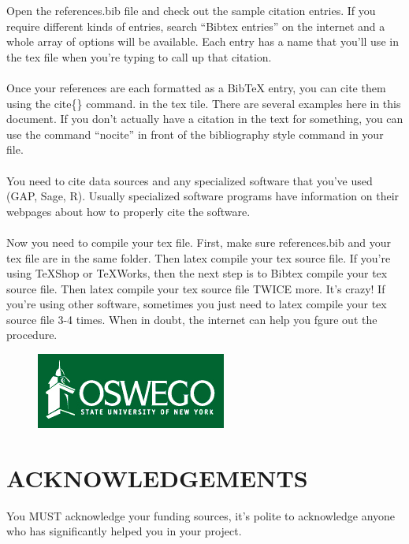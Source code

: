 \documentclass[landscape]{sciposter}
\begin{document}
\begin{multicols}{4}
Open the references.bib file and check out the sample citation entries.  If you require different kinds of entries, search ``Bibtex entries'' on the internet and a whole array of options will be available.  Each entry has a name that you'll use in the tex file when you're typing to call up that citation.
\\
\\
Once your references are each formatted as a BibTeX entry, you can cite them using the cite\{\} command.  in the tex tile.  There are several examples here in this document.  If you don't actually have a citation in the text for something, you can use the command ``nocite'' in front of the bibliography style command in your file.  
\\
\\
You need to cite data sources and any specialized software that you've used (GAP, Sage, R).  Usually specialized software programs have information on their webpages about how to properly cite the software.  
\\
\\
Now you need to compile your tex file.  First, make sure references.bib and your tex file are in the same folder.  Then latex compile your tex source file.  If you're using TeXShop or TeXWorks, then the next step is to Bibtex compile your tex source file.  Then latex compile your tex source file TWICE more.  It's crazy!  If you're using other software, sometimes you just need to latex compile your tex source file 3-4 times.  When in doubt, the internet can help you fgure out the procedure.

\begin{figure}
\centering
\includegraphics[scale = 2.0]{oswegologo}
\end{figure}



\section{ACKNOWLEDGEMENTS}

You MUST acknowledge your funding sources, it's polite to acknowledge anyone who has significantly helped you in your project.


\nocite{WinNT}
\nocite{GAP4}



\end{multicols}

\section*{ }
\end{document}
